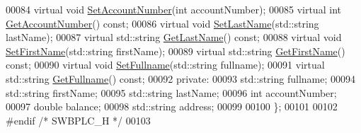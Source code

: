 \begin{DoxyCode}
00084     \textcolor{keyword}{virtual} \textcolor{keywordtype}{void} \hyperlink{class_s_w_b_p_l_c_a45eb1e6a73fde0dc00824319d4e0b81a}{SetAccountNumber}(\textcolor{keywordtype}{int} accountNumber);
00085     \textcolor{keyword}{virtual} \textcolor{keywordtype}{int} \hyperlink{class_s_w_b_p_l_c_a1a997f6d333e5021970e50605431d7df}{GetAccountNumber}() \textcolor{keyword}{const};
00086     \textcolor{keyword}{virtual} \textcolor{keywordtype}{void} \hyperlink{class_s_w_b_p_l_c_aa5581ea5d2e0315b816876737e887f09}{SetLastName}(std::string lastName);
00087     \textcolor{keyword}{virtual} std::string \hyperlink{class_s_w_b_p_l_c_a72b2595acea28dae9e4f5816dd3c4652}{GetLastName}() \textcolor{keyword}{const};
00088     \textcolor{keyword}{virtual} \textcolor{keywordtype}{void} \hyperlink{class_s_w_b_p_l_c_a8146eabca4648ef679188904f677df9d}{SetFirstName}(std::string firstName);
00089     \textcolor{keyword}{virtual} std::string \hyperlink{class_s_w_b_p_l_c_ace6bbcd6546896e581e3a2ee9504d090}{GetFirstName}() \textcolor{keyword}{const};
00090     \textcolor{keyword}{virtual} \textcolor{keywordtype}{void} \hyperlink{class_s_w_b_p_l_c_a09376d46475bbceda897948714ff1e72}{SetFullname}(std::string fullname);
00091     \textcolor{keyword}{virtual} std::string \hyperlink{class_s_w_b_p_l_c_adb74b3cbc40a401bf7ca4dfb5269c336}{GetFullname}() \textcolor{keyword}{const};
00092 \textcolor{keyword}{private}:
00093     std::string fullname;
00094     std::string firstName;
00095     std::string lastName;
00096     \textcolor{keywordtype}{int} accountNumber;
00097     \textcolor{keywordtype}{double} balance;
00098     std::string address;
00099 
00100 \};
00101 
00102 \textcolor{preprocessor}{#endif }\textcolor{comment}{/* SWBPLC\_H */}\textcolor{preprocessor}{}
00103 
\end{DoxyCode}
